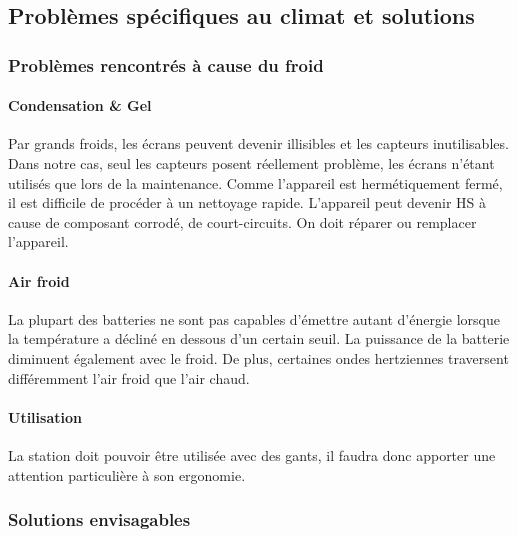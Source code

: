\subsection{Problèmes spécifiques au climat et solutions}

\subsubsection{Problèmes rencontrés à cause du froid}

\paragraph{Condensation \&  Gel}

Par grands froids, les écrans peuvent devenir illisibles et les capteurs inutilisables. Dans notre cas, seul les capteurs posent réellement problème, les écrans n'étant utilisés que lors de la maintenance.
Comme l’appareil est hermétiquement fermé, il est difficile de procéder à un nettoyage rapide. L’appareil peut devenir HS à cause de composant corrodé, de court-circuits. On doit réparer ou remplacer l’appareil.

\paragraph{Air froid}

La plupart des batteries ne sont pas capables d’émettre autant d'énergie lorsque la température a décliné en dessous d'un certain seuil. La puissance de la batterie diminuent également avec le froid.
De plus, certaines ondes hertziennes traversent différemment l’air froid que l’air chaud\footnotemark.


\paragraph{Utilisation}

La station doit pouvoir être utilisée avec des gants, il faudra donc apporter une attention particulière à son ergonomie.

\subsubsection{Solutions envisagables}

